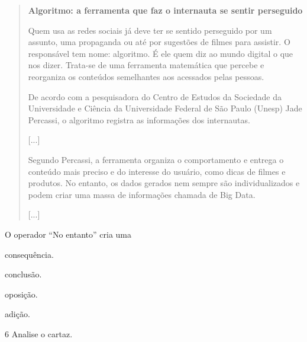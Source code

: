 \begin{quote}
\textbf{Algoritmo: a ferramenta que faz o internauta se sentir perseguido}

Quem usa as redes sociais já deve ter se sentido perseguido por um assunto, uma propaganda ou até por sugestões de filmes para assistir. O responsável tem nome: algoritmo. É ele quem diz ao mundo digital o que nos dizer. Trata-se de uma ferramenta matemática que percebe e reorganiza os conteúdos semelhantes aos acessados pelas pessoas.

De acordo com a pesquisadora do Centro de Estudos da Sociedade da Universidade e Ciência da Universidade Federal de São Paulo (Unesp) Jade Percassi, o algoritmo registra as informações dos internautas.

{[}...{]}

Segundo Percassi, a ferramenta organiza o comportamento e entrega o conteúdo mais preciso e do interesse do usuário, como dicas de filmes e produtos. No entanto, os dados gerados nem sempre são individualizados e podem criar uma massa de informações chamada de Big Data.

{[}...{]}

\end{quote}

O operador “No entanto” cria uma

\begin{minipage}{.5\textwidth}
\begin{escolha}
\item consequência.

\item conclusão.

\item oposição.

\item adição.
\end{escolha}
\end{minipage}

\pagebreak
\num{6} Analise o cartaz.

